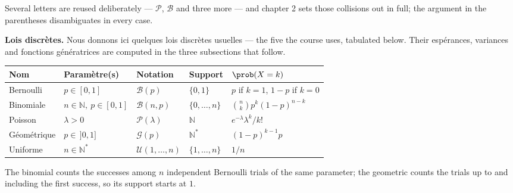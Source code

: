 \begin{notation}
  Several letters are reused deliberately --- $\mathcal{P}$, $\mathcal{B}$ and
  three more --- and chapter 2 sets those collisions out in full; the argument
  in the parentheses disambiguates in every case.
\end{notation}

\textbf{Lois discrètes.} Nous donnons ici quelques lois discrètes usuelles ---
the five the course uses, tabulated below. Their espérances, variances and
fonctions génératrices are computed in the three subsections that follow.

\begin{center}
  \begin{tabular}{lllll}
    \toprule
    Nom & Paramètre(s) & Notation & Support & $\prob(X = k)$ \\
    \midrule
    Bernoulli & $p \in [0,1]$ & $\mathcal{B}(p)$ & $\{0,1\}$ & $p$ if $k=1$, $1-p$ if $k=0$ \\
    Binomiale & $n \in \mathbb{N},\ p \in [0,1]$ & $\mathcal{B}(n,p)$ & $\{0,\dots,n\}$ & $\binom{n}{k} p^{k}(1-p)^{n-k}$ \\
    Poisson & $\lambda > 0$ & $\mathcal{P}(\lambda)$ & $\mathbb{N}$ & $e^{-\lambda} \lambda^{k}/k!$ \\
    Géométrique & $p \in\, ]0,1]$ & $\mathcal{G}(p)$ & $\mathbb{N}^{*}$ & $(1-p)^{k-1} p$ \\
    Uniforme & $n \in \mathbb{N}^{*}$ & $\mathcal{U}(1,\dots,n)$ & $\{1,\dots,n\}$ & $1/n$ \\
    \bottomrule
  \end{tabular}
\end{center}

The binomial counts the successes among $n$ independent Bernoulli trials of the
same parameter; the geometric counts the trials up to and including the first
success, so its support starts at $1$.

\begin{figure}[h!]
  \centering
\end{figure}

